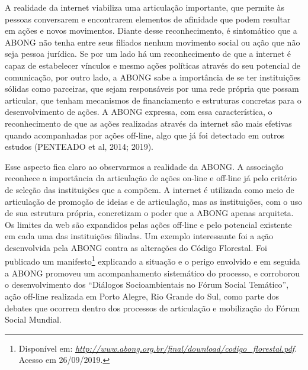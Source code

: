 A realidade da internet viabiliza uma articulação importante, que
permite às pessoas conversarem e encontrarem elementos de afinidade que
podem resultar em ações e novos movimentos. Diante desse reconhecimento,
é sintomático que a ABONG não tenha entre seus filiados nenhum movimento
social ou ação que não seja pessoa jurídica. Se por um lado há um
reconhecimento de que a internet é capaz de estabelecer vínculos e mesmo
ações políticas através do seu potencial de comunicação, por outro lado,
a ABONG sabe a importância de se ter instituições sólidas como
parceiras, que sejam responsáveis por uma rede própria que possam
articular, que tenham mecanismos de financiamento e estruturas concretas
para o desenvolvimento de ações. A ABONG expressa, com essa
característica, o reconhecimento de que as ações realizadas através da
internet são mais efetivas quando acompanhadas por ações off-line, algo
que já foi detectado em outros estudos (PENTEADO et al, 2014; 2019).

Esse aspecto fica claro ao observarmos a realidade da ABONG. A
associação reconhece a importância da articulação de ações on-line e
off-line já pelo critério de seleção das instituições que a compõem. A
internet é utilizada como meio de articulação de promoção de ideias e de
articulação, mas as instituições, com o uso de sua estrutura própria,
concretizam o poder que a ABONG apenas arquiteta. Os limites da web são
expandidos pelas ações off-line e pelo potencial existente em cada uma
das instituições filiadas. Um exemplo interessante foi a ação
desenvolvida pela ABONG contra as alterações do Código Florestal. Foi
publicado um manifesto\footnote{Disponível em:
  \href{http://www.abong.org.br/final/download/codigo_florestal.pdf}{\emph{http://www.abong.org.br/final/download/codigo\_florestal.pdf}}.
  Acesso em 26/09/2019.} explicando a situação e o perigo envolvido e em
seguida a ABONG promoveu um acompanhamento sistemático do processo, e
corroborou o desenvolvimento dos ``Diálogos Socioambientais no Fórum
Social Temático'', ação off-line realizada em Porto Alegre, Rio Grande
do Sul, como parte dos debates que ocorrem dentro dos processos de
articulação e mobilização do Fórum Social Mundial.

